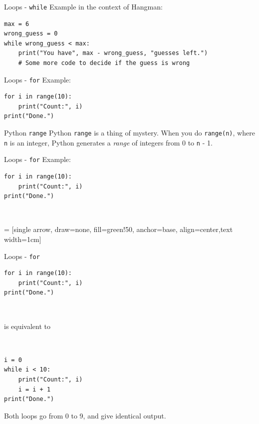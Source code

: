 \documentclass[dvipsnames, svgnames, x11names, handout]{beamer}
\begin{document}
\begin{frame}[fragile]{Loops - \texttt{while}}
Example in the context of Hangman:
\begin{verbatim}
max = 6
wrong_guess = 0
while wrong_guess < max:
    print("You have", max - wrong_guess, "guesses left.")
    # Some more code to decide if the guess is wrong
\end{verbatim}
\end{frame}

\begin{frame}[fragile]{Loops - \texttt{for}}
Example:
\begin{verbatim}
for i in range(10):
    print("Count:", i)
print("Done.")
\end{verbatim}
\begin{block}{Python \texttt{range}}
Python \texttt{range} is a thing of mystery. When you do \texttt{range(n)}, where \texttt{n} is an integer, Python generates a \textit{range} of integers from 0 to \texttt{n} - 1.
\end{block}
\end{frame}

\begin{frame}[fragile]{Loops - \texttt{for}}
Example:
\begin{verbatim}
for i in range(10):
    print("Count:", i)
print("Done.")
\end{verbatim}

\ 

 = [single arrow, draw=none, fill=green!50, anchor=base, align=center,text width=1cm]
\end{frame}

\begin{frame}[fragile]{Loops - \texttt{for}}
\begin{verbatim}
for i in range(10):
    print("Count:", i)
print("Done.")
\end{verbatim}

\

is equivalent to

\

\begin{verbatim}
i = 0
while i < 10:
    print("Count:", i)
    i = i + 1
print("Done.")
\end{verbatim}

Both loops go from 0 to 9, and give identical output.
\end{frame}
\end{document}

